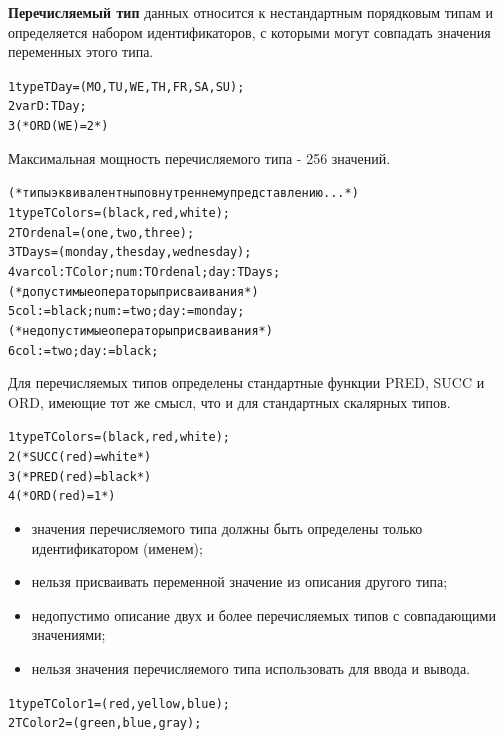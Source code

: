 \documentclass{beamer}
\begin{document}
\begin{frame}[fragile]
\textbf{Перечисляемый тип} данных относится к нестандартным порядковым типам и определяется набором идентификаторов, с которыми могут совпадать значения переменных этого типа.
\begin{alltt}
1  type TDay = (MO, TU, WE, TH, FR, SA, SU);
2  var  D: TDay; 	
3  (* ORD (WE) = 2 *)
\end{alltt}
Максимальная мощность перечисляемого типа - 256 значений.
\begin{alltt}
(* типы эквивалентны по внутреннему представлению...*)
1  type TColors = (black, red, white );
2       TOrdenal=(one, two, three);
3       TDays=(monday, thesday, wednesday); 	
4  var  col: TColor; num: TOrdenal; day: TDays;
(* допустимые операторы присваивания *)
5  col := black; num := two; day := monday;
(* недопустимые операторы присваивания *)
6  col := two; day := black;
\end{alltt}
\end{frame}
   
\begin{frame}[fragile]
Для перечисляемых типов определены стандартные функции PRED, SUCC и ORD, имеющие тот же смысл, что и для стандартных скалярных типов.
\begin{alltt}
1  type TColors = (black, red, white);
2  (* SUCC(red) = white *)
3  (* PRED(red) = black *)
4  (* ORD(red) = 1 *)
\end{alltt}
\begin{itemize}
\item значения перечисляемого типа должны быть определены только идентификатором (именем);
\item нельзя присваивать переменной значение из описания другого типа;
\item недопустимо описание двух и более перечисляемых типов с совпадающими значениями;
\item нельзя значения перечисляемого типа использовать для ввода и вывода.
\end{itemize}
\begin{alltt}
1 type TColor1 = (red, yellow, blue);
2      TColor2 = (green, blue, gray);
\end{alltt}
\end{frame}   
\end{document}
